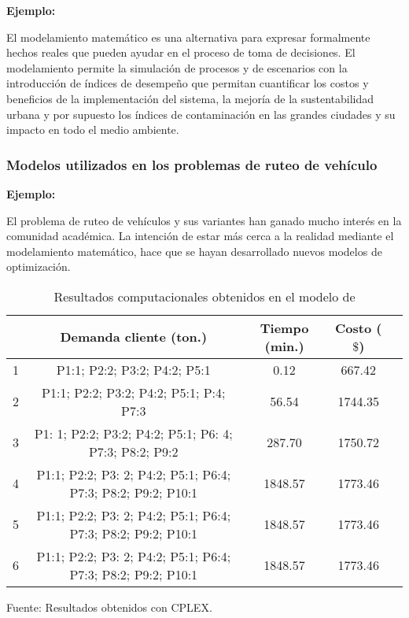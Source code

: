 {\bf Ejemplo:}\par

El modelamiento matemático es una alternativa para expresar formalmente hechos reales que pueden ayudar en el proceso de toma de decisiones. El modelamiento permite la simulación de procesos  y de escenarios con la introducción de índices de desempeño que permitan cuantificar los costos y beneficios de la implementación del sistema, la mejoría de la sustentabilidad urbana y por supuesto los índices de contaminación en las grandes ciudades y su impacto en todo el medio ambiente. 

\subsubsection{Modelos utilizados en los problemas de ruteo de vehículo }

{\bf Ejemplo:}\par

El problema de ruteo de vehículos \citep{Ombuki, Yeun} y sus variantes han ganado mucho interés en la comunidad académica. La intención de estar más cerca a la realidad mediante el modelamiento matemático, hace que se hayan desarrollado nuevos modelos de optimización. \par
\vskip 0.2cm

\begin{table}[h!]
\begin{center}
\caption{\small{Resultados computacionales obtenidos en el modelo de \cite{Ombuki}}}
\end{center}
\vskip -0.7cm
\begin{tabular}{|c|c|c|c|c|}
\hline 
\rowcolor{LightBlue2}{\small Escenarios} & {\small Demanda cliente (ton.)} & {\small Tiempo (min.)} & {\small Costo ($\$$)} \\ 
\hline 
{\small 1} & {\small P1:1; P2:2; P3:2; P4:2; P5:1} & {\small 0.12} & {\small 667.42} \\ 
\hline 
{\small 2} & {\small P1:1; P2:2; P3:2; P4:2; P5:1; P:4; P7:3} & {\small 56.54} & {\small 1744.35} \\ 
\hline 
{\small 3} & {\small P1: 1; P2:2; P3:2; P4:2; P5:1; P6: 4; P7:3; P8:2; P9:2} & {\small 287.70} & {\small 1750.72} \\ 
\hline 
{\small 4} & {\small P1:1; P2:2; P3: 2; P4:2; P5:1; P6:4; P7:3; P8:2; P9:2; P10:1} & {\small 1848.57} & {\small 1773.46} \\ 
\hline 
{\small 5} & {\small P1:1; P2:2; P3: 2; P4:2; P5:1; P6:4; P7:3; P8:2; P9:2; P10:1} & {\small 1848.57} & {\small 1773.46} \\ 
\hline 
{\small 6} & {\small P1:1; P2:2; P3: 2; P4:2; P5:1; P6:4; P7:3; P8:2; P9:2; P10:1} & {\small 1848.57} & {\small 1773.46} \\ 
\hline 
\end{tabular} 
\begin{center}
\vskip -0.2cm
{\small{Fuente: Resultados obtenidos con CPLEX.}}
\end{center}
\end{table}



